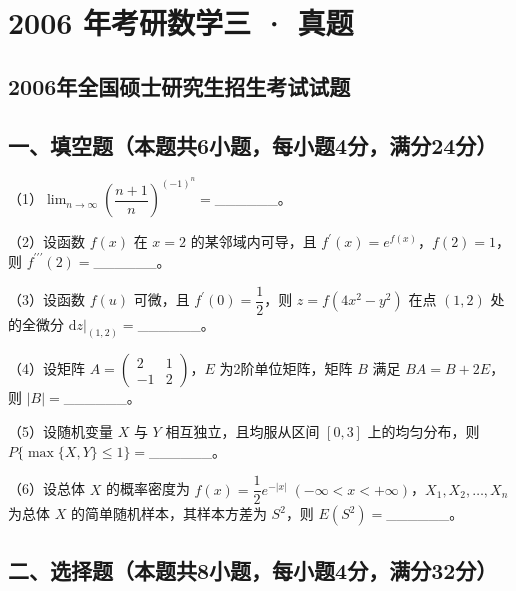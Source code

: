 \documentclass[UTF8,12pt]{ctexart}
\begin{document}
\section*{2006 年考研数学三 · 真题}
\subsection*{2006年全国硕士研究生招生考试试题}

\subsection*{一、填空题（本题共6小题，每小题4分，满分24分）}

（1）\(\displaystyle \lim_{n\to\infty}\left(\dfrac{\displaystyle n+1}{\displaystyle n}\right)^{(-1)^n}=\)\_\_\_\_\_\_。


（2）设函数 \(\displaystyle f(x)\) 在 \(\displaystyle x=2\) 的某邻域内可导，且 \(\displaystyle f^{\prime}(x)=e^{f(x)}\)，\(\displaystyle f(2)=1\)，则 \(\displaystyle f^{\prime\prime\prime}(2)=\)\_\_\_\_\_\_。


（3）设函数 \(\displaystyle f(u)\) 可微，且 \(\displaystyle f^{\prime}(0)=\dfrac{\displaystyle 1}{\displaystyle 2}\)，则 \(\displaystyle z=f(4x^2-y^2)\) 在点 \(\displaystyle (1,\allowbreak 2)\) 处的全微分 \(\displaystyle \left.\mathrm dz\right|_{(1,\allowbreak 2)}=\)\_\_\_\_\_\_。


（4）设矩阵 \(\displaystyle A=\begin{pmatrix}2&1\\-1&2\end{pmatrix}\)，\(\displaystyle E\) 为2阶单位矩阵，矩阵 \(\displaystyle B\) 满足 \(\displaystyle BA=B+2E\)，则 \(\displaystyle |B|=\)\_\_\_\_\_\_。


（5）设随机变量 \(\displaystyle X\) 与 \(\displaystyle Y\) 相互独立，且均服从区间 \(\displaystyle [0,\allowbreak 3]\) 上的均匀分布，则 \(\displaystyle P\{\displaystyle \max\{X,\allowbreak Y\}\le1\}=\)\_\_\_\_\_\_。


（6）设总体 \(\displaystyle X\) 的概率密度为 \(\displaystyle f(x)=\dfrac{\displaystyle 1}{\displaystyle 2}e^{-|x|}\;(-\infty<x<+\infty)\)，\(\displaystyle X_1,\allowbreak X_2,\allowbreak \ldots,\allowbreak X_n\) 为总体 \(\displaystyle X\) 的简单随机样本，其样本方差为 \(\displaystyle S^2\)，则 \(\displaystyle E(S^2)=\)\_\_\_\_\_\_。


\subsection*{二、选择题（本题共8小题，每小题4分，满分32分）}
\end{document}
